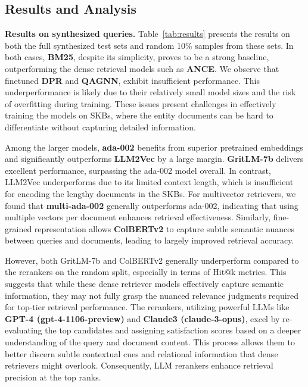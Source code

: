 \subsection{Results and Analysis}
\vspace{-2pt}




\textbf{Results on synthesized queries.} 
Table~\ref{tab:results} presents the results on both the full synthesized test sets and random 10\% samples from these sets. In both cases, \textbf{BM25}, despite its simplicity, proves to be a strong baseline, outperforming the dense retrieval models such as \textbf{ANCE}. We observe that finetuned \textbf{DPR} and \textbf{QAGNN}, exhibit insufficient performance. This underperformance is likely due to their relatively small model sizes and the risk of overfitting during training. These issues present challenges in effectively training the models on SKBs, where the entity documents can be hard to differentiate without capturing detailed information.

Among the larger models, \textbf{ada-002} benefits from superior pretrained embeddings and significantly outperforms \textbf{LLM2Vec} by a large margin. \textbf{GritLM-7b} delivers excellent performance, surpassing the ada-002 model overall. In contrast, LLM2Vec underperforms due to its limited context length, which is insufficient for encoding the lengthy documents in the SKBs. For multivector retrievers, we found that \textbf{multi-ada-002} generally outperforms ada-002, indicating that using multiple vectors per document enhances retrieval effectiveness. Similarly, fine-grained representation allows \textbf{ColBERTv2} to capture subtle semantic nuances between queries and documents, leading to largely improved retrieval accuracy. 

However, both GritLM-7b and ColBERTv2 generally underperform compared to the rerankers on the random split, especially in terms of Hit@k metrics. This suggests that while these dense retriever models effectively capture semantic information, they may not fully grasp the nuanced relevance judgments required for top-tier retrieval performance. The rerankers, utilizing powerful LLMs like \textbf{GPT-4 (gpt-4-1106-preview)} and \textbf{Claude3 (claude-3-opus)}, excel by re-evaluating the top candidates and assigning satisfaction scores based on a deeper understanding of the query and document content. This process allows them to better discern subtle contextual cues and relational information that dense retrievers might overlook. Consequently, LLM rerankers enhance retrieval precision at the top ranks.

